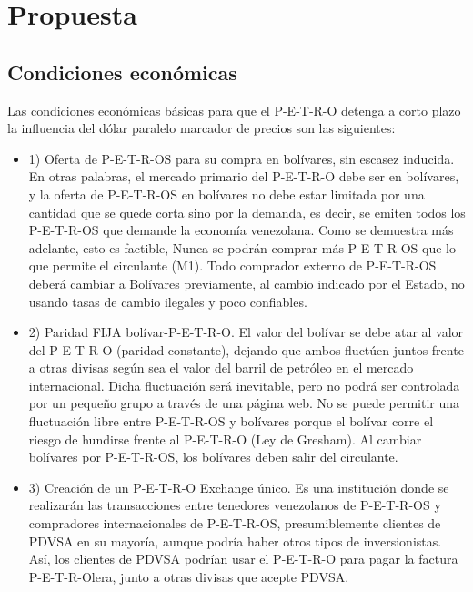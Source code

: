 %
\section{Propuesta}
\label{sec:proposal}
%
\subsection{Condiciones económicas}
\label{sec:overview}
%
Las condiciones económicas básicas para que el P-E-T-R-O detenga a corto plazo la influencia del dólar paralelo marcador de precios son las siguientes:
\begin{itemize}
\item{1)} Oferta de P-E-T-R-OS para su compra en bolívares, sin escasez inducida. En otras palabras, el mercado primario del P-E-T-R-O debe ser en bolívares, y la oferta de P-E-T-R-OS en bolívares no debe estar limitada por una cantidad que se quede corta sino por la demanda, es decir, se emiten todos los P-E-T-R-OS que demande la economía venezolana. Como se demuestra más adelante,  esto es factible, Nunca se podrán comprar más P-E-T-R-OS que lo que permite el circulante (M1). Todo comprador externo de P-E-T-R-OS deberá cambiar a Bolívares previamente, al cambio indicado por el Estado, no usando tasas de cambio ilegales y poco confiables.
%
\item{2)} Paridad FIJA bolívar-P-E-T-R-O. El valor del bolívar se debe atar al valor del P-E-T-R-O (paridad constante), dejando que ambos fluctúen juntos frente a otras divisas según sea el valor del barril de petróleo en el mercado internacional. Dicha fluctuación será inevitable, pero no podrá ser controlada por un pequeño grupo a través de una página web. No se puede permitir una fluctuación libre entre P-E-T-R-OS y bolívares porque el bolívar corre el riesgo de hundirse frente al P-E-T-R-O (Ley de Gresham). Al cambiar bolívares por P-E-T-R-OS, los bolívares deben salir del circulante.
%   
\item{3)} Creación de un P-E-T-R-O Exchange único. Es una institución donde se realizarán las transacciones entre tenedores venezolanos de P-E-T-R-OS y compradores internacionales de P-E-T-R-OS, presumiblemente clientes de PDVSA en su mayoría, aunque podría haber otros tipos de inversionistas. Así, los clientes de PDVSA podrían usar el P-E-T-R-O para pagar la factura P-E-T-R-Olera, junto a otras divisas que acepte PDVSA.
\end{itemize}
